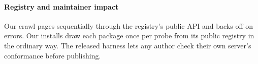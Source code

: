 \paragraph{Registry and maintainer impact}
Our crawl pages sequentially through the registry's public API and backs off on
errors. Our installs draw each package once per probe from its public registry
in the ordinary way. The released harness lets any author check their own server's
conformance before publishing.
